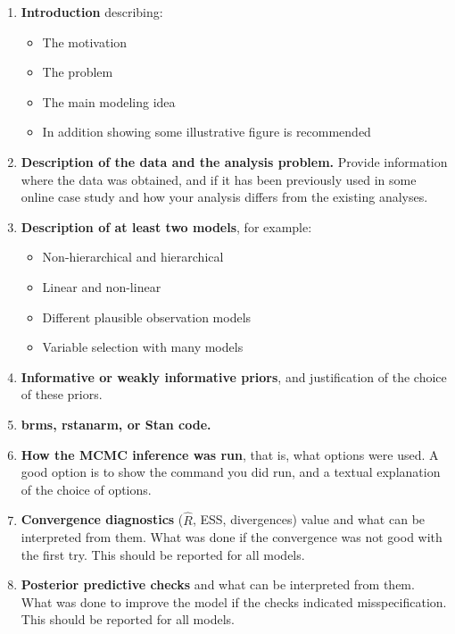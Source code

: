 \documentclass[11pt,a4paper]{article}
\begin{document}
\begin{enumerate}
    \item \textbf{Introduction} describing:
    \begin{itemize}
        \item The motivation
        \item The problem
        \item The main modeling idea
        \item In addition showing some illustrative figure is recommended
    \end{itemize}
    
    \item \textbf{Description of the data and the analysis problem.} Provide information where the data was obtained, and if it has been previously used in some online case study and how your analysis differs from the existing analyses.
    
    \item \textbf{Description of at least two models}, for example:
    \begin{itemize}
        \item Non-hierarchical and hierarchical
        \item Linear and non-linear
        \item Different plausible observation models
        \item Variable selection with many models
    \end{itemize}
    
    \item \textbf{Informative or weakly informative priors}, and justification of the choice of these priors.
    
    \item \textbf{brms, rstanarm, or Stan code.}
    
    \item \textbf{How the MCMC inference was run}, that is, what options were used. A good option is to show the command you did run, and a textual explanation of the choice of options.
    
    \item \textbf{Convergence diagnostics} ($\hat{R}$, ESS, divergences) value and what can be interpreted from them. What was done if the convergence was not good with the first try. This should be reported for all models.
    
    \item \textbf{Posterior predictive checks} and what can be interpreted from them. What was done to improve the model if the checks indicated misspecification. This should be reported for all models.
    

\end{enumerate}
\end{document}
